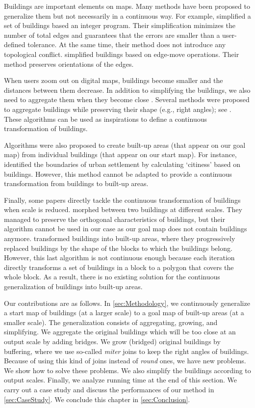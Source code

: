 Buildings are important elements on maps. 
Many methods have been proposed to generalize them 
but not necessarily in a continuous way.
For example, \citet{Haunertwolff2010Building} simplified a set 
of buildings based an integer program.
Their simplification minimizes the number of total edges and 
guarantees that the errors are smaller than 
a user-defined tolerance.
At the same time, their method does not introduce any topological conflict.
\citet{Buchin2011_Simp} simplified buildings based on 
edge-move operations.
Their method preserves orientations of the edges.

When users zoom out on digital maps, 
buildings become smaller and 
the distances between them decrease. 
In addition to simplifying the buildings,
we also need to aggregate them when they become close \cite{Weibel1997}. 
Several methods were proposed 
to aggregate buildings while preserving their shape 
(e.g., right angles);
see \citet{Regnauld2001,RegnauldRevell07,Damen2008}. 
These algorithms can be used as inspirations 
to define a continuous transformation of buildings.

Algorithms were also proposed to create 
built-up areas (that appear on our goal map) from 
individual buildings (that appear on our start map). 
For instance, \citet{Chaudhry2008} identified 
the boundaries of urban settlement 
by calculating `citiness' based on buildings. 
However, this method cannot be adapted 
to provide a continuous transformation 
from buildings to built-up areas.

Finally, some papers directly tackle 
the continuous transformation of buildings 
when scale is reduced. 
\citet{Li2017_Building} morphed between two buildings 
at different scales.
They managed to preserve the orthogonal characteristics of 
buildings, but their algorithm cannot be used in our case 
as our goal map does not contain buildings anymore.
\citet{Touya2017Progressive} 
transformed buildings into built-up areas, 
where they progressively replaced buildings 
by the shape of the blocks to which the buildings belong. 
However, this last algorithm is not continuous enough 
because each iteration directly transforms 
a set of buildings in a block to a polygon 
that covers the whole block. 
As a result, there is no existing solution 
for the continuous generalization of buildings 
into built-up areas.


Our contributions are as follows.
In \sect\ref{sec:Methodology},
we continuously generalize a start map of buildings
(at a larger scale) 
to a goal map of built-up areas (at a smaller scale).
The generalization consists of 
aggregating, growing, and simplifying.
We aggregate the original buildings which will be too close 
at an output scale by adding bridges.
We grow (bridged) original buildings by buffering,
where we use so-called \emph{miter} joins to keep the right 
angles of buildings.
Because of using this kind of joins 
instead of \emph{round} ones,
we have new problems.
We show how to solve these problems.
We also simplify the buildings according to output scales.
Finally, we analyze running time at the end of this section.
We carry out a case study 
and discuss the performances of our method in 
\sect\ref{sec:CaseStudy}.
We conclude this chapter in \sect\ref{sec:Conclusion}.

